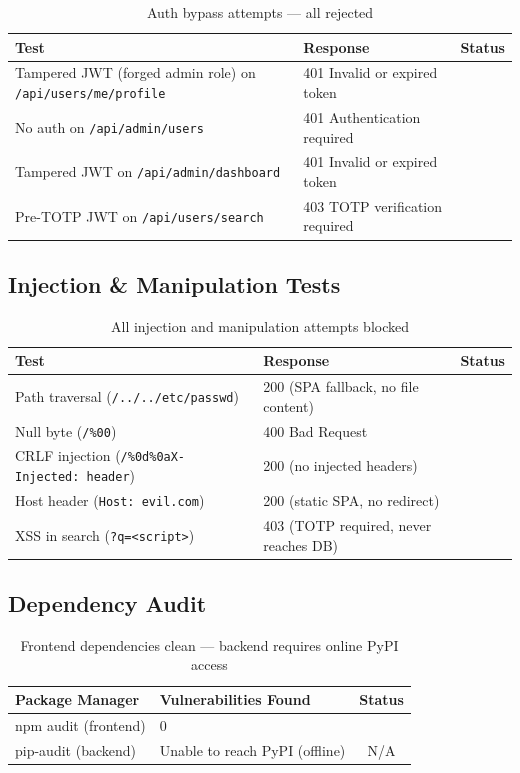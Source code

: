 \documentclass[12pt,a4paper]{article}
\newcommand{\pass}{\textcolor{success}{\checkmark}}
\begin{document}
\begin{table}[H]
\centering
\begin{tabularx}{\textwidth}{Xlc}
\toprule
\textbf{Test} & \textbf{Response} & \textbf{Status} \\
\midrule
Tampered JWT (forged admin role) on \texttt{/api/users/me/profile} & 401 Invalid or expired token & \pass \\
No auth on \texttt{/api/admin/users} & 401 Authentication required & \pass \\
Tampered JWT on \texttt{/api/admin/dashboard} & 401 Invalid or expired token & \pass \\
Pre-TOTP JWT on \texttt{/api/users/search} & 403 TOTP verification required & \pass \\
\bottomrule
\end{tabularx}
\caption{Auth bypass attempts --- all rejected}
\end{table}

\subsection{Injection \& Manipulation Tests}

\begin{table}[H]
\centering
\begin{tabularx}{\textwidth}{Xlc}
\toprule
\textbf{Test} & \textbf{Response} & \textbf{Status} \\
\midrule
Path traversal (\texttt{/../../etc/passwd}) & 200 (SPA fallback, no file content) & \pass \\
Null byte (\texttt{/\%00}) & 400 Bad Request & \pass \\
CRLF injection (\texttt{/\%0d\%0aX-Injected: header}) & 200 (no injected headers) & \pass \\
Host header (\texttt{Host: evil.com}) & 200 (static SPA, no redirect) & \pass \\
XSS in search (\texttt{?q=<script>}) & 403 (TOTP required, never reaches DB) & \pass \\
\bottomrule
\end{tabularx}
\caption{All injection and manipulation attempts blocked}
\end{table}

\subsection{Dependency Audit}

\begin{table}[H]
\centering
\begin{tabular}{llc}
\toprule
\textbf{Package Manager} & \textbf{Vulnerabilities Found} & \textbf{Status} \\
\midrule
npm audit (frontend) & 0 & \pass \\
pip-audit (backend) & Unable to reach PyPI (offline) & N/A \\
\bottomrule
\end{tabular}
\caption{Frontend dependencies clean --- backend requires online PyPI access}
\end{table}
\end{document}
